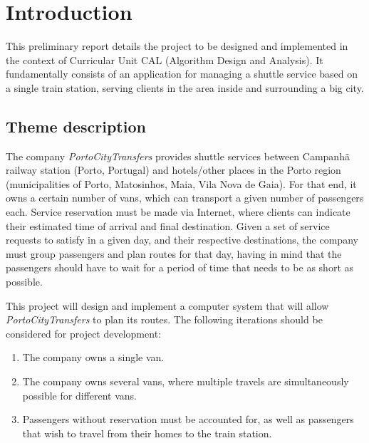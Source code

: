 \chapter{Introduction} \label{introduction}
This preliminary report details the project to be designed and implemented in the context of Curricular Unit CAL (Algorithm Design and Analysis).
It fundamentally consists of an application for managing a shuttle service based on a single train station, serving clients in the area inside and surrounding a big city.
\section{Theme description}
The company \emph{PortoCityTransfers} provides shuttle services between Campanhã railway station (Porto, Portugal) and hotels/other places in the Porto region (municipalities of Porto, Matosinhos, Maia, Vila Nova de Gaia). For that end, it owns a certain number of vans, which can transport a given number of passengers each. Service reservation must be made via Internet, where clients can indicate their estimated time of arrival and final destination. Given a set of service requests to satisfy in a given day, and their respective destinations, the company must group passengers and plan routes for that day, having in mind that the passengers should have to wait for a period of time that needs to be as short as possible.\par
This project will design and implement a computer system that will allow \emph{PortoCityTransfers} to plan its routes. The following iterations should be considered for project development:
\begin{enumerate}
    \item The company owns a single van.
    \item The company owns several vans, where multiple travels are simultaneously possible for different vans.
    \item Passengers without reservation must be accounted for, as well as passengers that wish to travel from their homes to the train station.
\end{enumerate}
